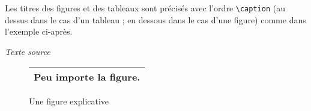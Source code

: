 \documentclass[a4paper,12pt,openright]{article}
\begin{document}
Les titres des figures et des tableaux sont précisés avec l’ordre \texttt{{\backslash}caption} (au
dessus dans le cas d’un tableau ; en dessous dans le cas d’une figure) comme
dans l’exemple ci-après.
\begin{center} %
\begin{minipage}{\textwidth}
\begin{center}
\textit{Texte source}\\[.5em]
{%
\begin{boxedverbatim}
\begin{figure}
  \begin{tabular}{|c|}
    \hline
    \centerline{Peu importe la figure.}\\
    \hline
  \end{tabular}
\caption{Une figure explicative}
\end{figure}


\end{boxedverbatim}}
\end{center}
\end{minipage}
\end{center}
\end{document}
